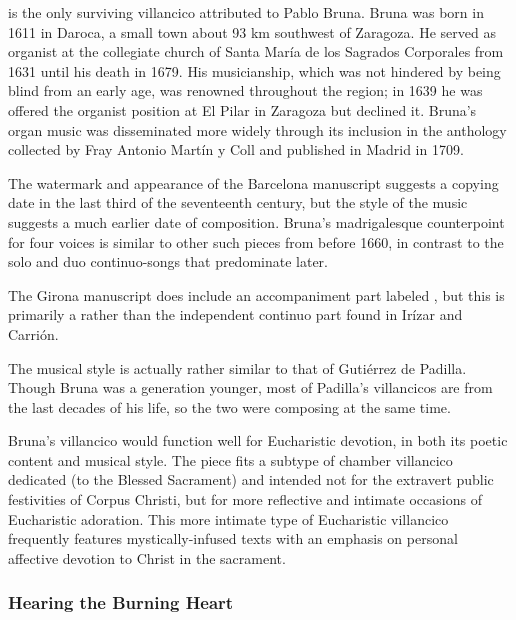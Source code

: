  is the only surviving villancico attributed to Pablo
Bruna.
Bruna was born in 1611 in Daroca, a small town about 93 km southwest of
Zaragoza.
He served as organist at the collegiate church of Santa María de los Sagrados
Corporales from 1631 until his death in 1679.%
	\Autocite[104]{Calahorra:Aragon}
His musicianship, which was not hindered by being blind from an early age, was
renowned throughout the region; in 1639 he was offered the organist position at
El Pilar in Zaragoza but declined it.%
    \Autocite[123--125]{Calahorra:Aragon}
Bruna's organ music was disseminated more widely through its inclusion in the
anthology  collected by Fray
Antonio Martín y Coll and published in Madrid in 1709.

The watermark and appearance of the Barcelona manuscript suggests a copying
date in the last third of the seventeenth century, but the style of the music
suggests a much earlier date of composition.%
Bruna's madrigalesque counterpoint for four voices is similar to other such
pieces from before 1660, in contrast to the solo and duo continuo-songs that
predominate later.%
\begin{Footnote}
    The Girona manuscript does include an accompaniment part labeled
    , but this is primarily a  rather
    than the independent continuo part found in Irízar and Carrión.
\end{Footnote}
The musical style is actually rather similar to that of Gutiérrez de Padilla. 
Though Bruna was a generation younger, most of Padilla's villancicos are from
the last decades of his life, so the two were composing at the same time.

Bruna's villancico would function well for Eucharistic devotion, in both its
poetic content and musical style.  
The piece fits a subtype of chamber villancico dedicated  (to the Blessed Sacrament) and intended not for the extravert
public festivities of Corpus Christi, but for more reflective and intimate
occasions of Eucharistic adoration.
This more intimate type of Eucharistic villancico frequently features
mystically-infused texts with an emphasis on personal affective devotion to
Christ in the sacrament.  

\subsubsection{Hearing the Burning Heart}

